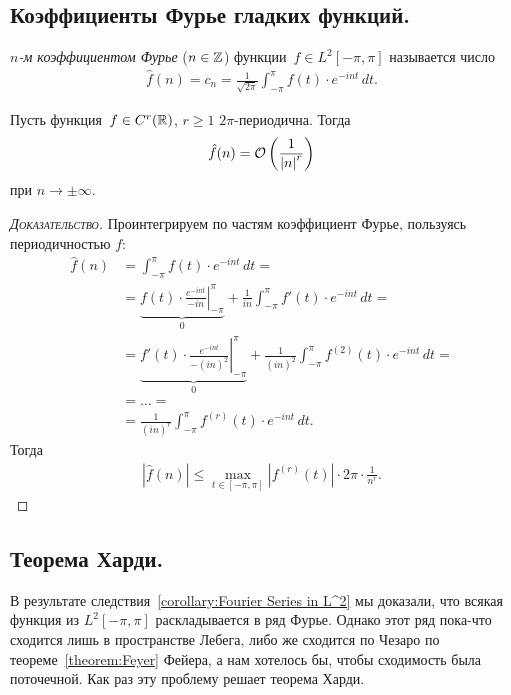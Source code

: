 \documentclass[../complex-analysis.tex]{subfiles}
\begin{document}
\subsection{Коэффициенты Фурье гладких функций.}

\begin{df}
 \emph{$ n $-м коэффициентом Фурье} ($ n \in \mathbb{Z} $) функции~$ f \in L^{2}[-\pi,\pi] $ называется число
 \begin{align*}
  \hat f(n) = c_n = \frac{1}{\sqrt{2\pi}} \int_{-\pi}^{\pi} f(t) \cdot e^{-int}\,dt.
 \end{align*}
\end{df}

\begin{thm}
 \label{theorem:Fourier Coeffiecents of Smooth Funs}
 Пусть функция~$ f \in C^{r}(\mathbb{R}) $, $ r \geqslant 1 $ $ 2\pi $-периодична. Тогда
 \begin{align*}
  \hat f(n) = \mathcal{O}\left( \frac{1}{\left| n \right|^{r}}\right)
 \end{align*} при $ n \to \pm\infty $.
\end{thm}
\begin{proof}[\normalfont\textsc{Доказательство}]
 Проинтегрируем по частям коэффициент Фурье, пользуясь периодичностью $ f $:
 \begin{align*}
  \hat f(n) &= \int_{-\pi}^{\pi} f(t) \cdot e^{-int}\,dt = \\
  &= \underbrace{f(t) \cdot \left.\frac{e^{-int}}{-in}\right|_{-\pi}^{\pi}}_{0} + \frac{1}{in} \int_{-\pi}^{\pi} f'(t) \cdot e^{-int}\,dt = \\
   &= \underbrace{\left.f'(t) \cdot \frac{e^{-int}}{-(in)^{2}}\right|_{-\pi}^{\pi}}_{0} + \frac{1}{(in)^{2}} \int_{-\pi}^{\pi} f^{(2)}(t) \cdot e ^{-int}\,dt = \\
    &= \ldots = \\
    &= \frac{1}{(in)^{r}} \int_{-\pi}^{\pi} f^{(r)}(t) \cdot e^{-int}\,dt.
 \end{align*} Тогда
  \begin{align*}
   \left| \hat f(n) \right| \leqslant \max_{t \in [-\pi,\pi]} \left| f^{(r)}(t) \right| \cdot 2\pi \cdot \frac{1}{n^{r}}.
  \end{align*}
 \end{proof}

 \subsection{Теорема Харди.}

 В результате следствия~\ref{corollary:Fourier Series in L^2} мы доказали, что всякая функция из $ L^{2}[-\pi,\pi] $ раскладывается в ряд Фурье. Однако этот ряд пока-что сходится лишь в пространстве Лебега, либо же сходится по Чезаро по теореме~\ref{theorem:Feyer} Фейера, а нам хотелось бы, чтобы сходимость была поточечной. Как раз эту проблему решает теорема Харди.
\end{document}
